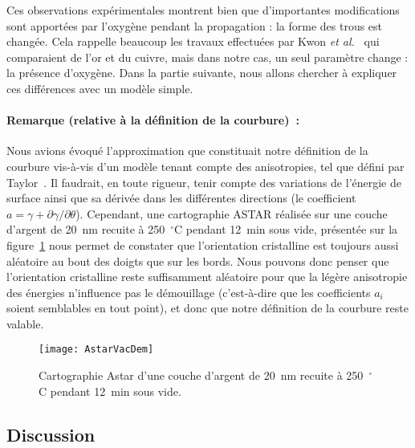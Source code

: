 {{Ces observations expérimentales montrent bien que d’importantes modifications sont apportées par l’oxygène pendant la propagation : la forme des trous est changée. Cela rappelle beaucoup les travaux effectuées par Kwon\textit{ et al.}~\cite{kwon2003comparison} qui comparaient de l’or et du cuivre, mais dans notre cas, un seul paramètre change : la présence d’oxygène. Dans la partie suivante, nous allons chercher à expliquer ces différences avec un modèle simple.\par 

\paragraph*{Remarque (relative à la définition de la courbure)~:}
Nous avions évoqué l’approximation que constituait notre définition de la courbure vis-à-vis d’un modèle tenant compte des anisotropies, tel que défini par Taylor~\cite{taylor1992ii}. Il faudrait, en toute rigueur, tenir compte des variations de l’énergie de surface ainsi que sa dérivée dans les différentes directions (le coefficient $a=\gamma+\partial\gamma/\partial\theta$). Cependant, une cartographie ASTAR réalisée sur une couche d’argent de 20~nm recuite à 250~$^\circ$C pendant 12~min sous vide, présentée sur la figure~\ref{astarVacDem} nous permet de constater que l’orientation cristalline est toujours aussi aléatoire au bout des doigts que sur les bords. Nous pouvons donc penser que l’orientation cristalline reste suffisamment aléatoire pour que la légère anisotropie des énergies n’influence pas le démouillage (c'est-à-dire que les coefficients $a_i$ soient semblables en tout point), et donc que notre définition de la courbure reste valable.\par 

\begin{figure}[!htb]
\centering
\texttt{[image: AstarVacDem]}
\caption{Cartographie Astar d’une couche d’argent de 20~nm recuite à 250~$^\circ$C pendant 12~min sous vide.}
\label{astarVacDem}
\end{figure}

		\subsection{Discussion}

}}
